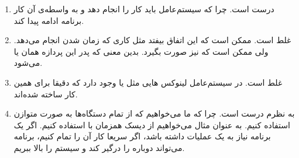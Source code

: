 \begin{enumerate}
    \item درست است. چرا که سیستم‌عامل باید کار
    را انجام دهد و به واسطه‌ی آن کار برنامه ادامه پیدا کند.
    \item غلط است. ممکن است که این اتفاق بیفتد مثل کاری که
    زمان
    شدن انجام می‌دهد. ولی ممکن است که
    نیز صورت بگیرد. بدین معنی که پدر این پردازه همان
     یا 
    می‌شود.
    \item غلط است. در سیستم‌عامل لینوکس
    هایی مثل
    یا
    وجود دارد که دقیقا برای همین کار ساخته شده‌اند.
    \item به نظرم درست است. چرا که ما می‌خواهیم که از تمام دستگاه‌ها به صورت متوازن استفاده کنیم.
    به عنوان مثال می‌خواهیم از دیسک همزمان با
    استفاده کنیم. اگر یک برنامه
    نیاز به یک عملیات
    داشته باشد، اگر سریعا کار آن را تمام کنیم، برنامه می‌تواند دوباره
    را درگیر کند و
    سیستم را بالا ببریم.
\end{enumerate}




